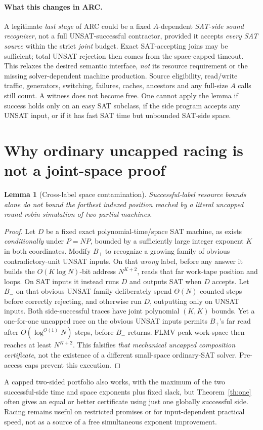 \documentclass[11pt]{article}
\newtheorem{lemma}[theorem]{Lemma}
\begin{document}
\paragraph{What this changes in ARC.}
A legitimate \emph{last stage} of ARC could be a fixed $A$-dependent
\emph{SAT-side sound recognizer}, not a full UNSAT-successful
contractor, provided it accepts \emph{every SAT source}
within the strict \emph{joint} budget. Exact SAT-accepting joins
may be sufficient; total UNSAT rejection then comes from the
space-capped timeout. This relaxes the desired semantic interface,
\emph{not} its resource requirement or the missing solver-dependent
machine production. Source eligibility, read/write traffic,
generators, switching, failures, caches, ancestors and any
full-size $A$ calls still count. A witness does not become free.
One cannot apply the lemma if success holds only on an easy
SAT subclass, if the side program accepts any UNSAT input,
or if it has fast SAT time but unbounded SAT-side space.

\section{Why ordinary uncapped racing is not a joint-space proof}
\begin{lemma}[Cross-label space contamination]
Successful-label resource bounds alone do not bound the
farthest indexed position reached by a literal uncapped
round-robin simulation of two partial machines.
\end{lemma}
\begin{proof}
Let $D$ be a fixed exact polynomial-time/space SAT machine,
as exists \emph{conditionally} under $P=NP$, bounded by a
sufficiently large integer exponent $K$ in both coordinates.
Modify $B_+$ to recognize a growing family of obvious
contradictory-unit UNSAT inputs. On that \emph{wrong} label,
before any answer it builds the $O(K\log N)$-bit address
$N^{K+2}$, reads that far work-tape position and loops.
On SAT inputs it instead runs $D$ and outputs SAT when $D$
accepts. Let $B_-$ on that obvious UNSAT family deliberately
spend $\Theta(N)$ counted steps before correctly rejecting,
and otherwise run $D$, outputting only on UNSAT inputs.
Both side-successful traces have joint polynomial
$(K,K)$ bounds. Yet a one-for-one uncapped race on the
obvious UNSAT inputs permits $B_+$'s far read after
$O(\log^{O(1)}N)$ steps, before $B_-$ returns.
FLMV peak work-space then reaches at least $N^{K+2}$.
This falsifies \emph{that mechanical uncapped composition
certificate}, not the existence of a different small-space
ordinary-SAT solver. Pre-access caps prevent this execution.
\end{proof}
A capped two-sided portfolio also works, with the maximum of
the two successful-side time and space exponents plus fixed
slack, but Theorem~\ref{th:one} often gives an equal or
better certificate using just one globally successful side.
Racing remains useful on restricted promises or for
input-dependent practical speed, not as a source of a
free simultaneous exponent improvement.
\end{document}
